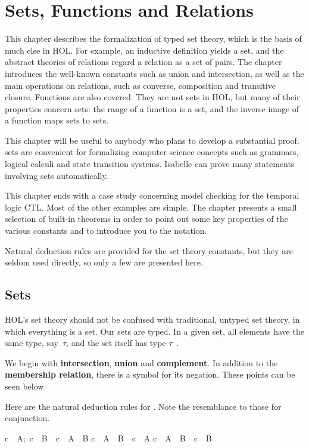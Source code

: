 \chapter{Sets, Functions and Relations}

This chapter describes the formalization of typed set theory, which is
the basis of much else in HOL\@.  For example, an
inductive definition yields a set, and the abstract theories of relations
regard a relation as a set of pairs.  The chapter introduces the well-known
constants such as union and intersection, as well as the main operations on relations, such as converse, composition and
transitive closure.  Functions are also covered.  They are not sets in
HOL, but many of their properties concern sets: the range of a
function is a set, and the inverse image of a function maps sets to sets.

This chapter will be useful to anybody who plans to develop a substantial
proof.  sets are convenient for formalizing  computer science concepts such
as grammars, logical calculi and state transition systems.  Isabelle can
prove many statements involving sets automatically.

This chapter ends with a case study concerning model checking for the
temporal logic CTL\@.  Most of the other examples are simple.  The
chapter presents a small selection of built-in theorems in order to point
out some key properties of the various constants and to introduce you to
the notation. 

Natural deduction rules are provided for the set theory constants, but they
are seldom used directly, so only a few are presented here.  


\section{Sets}

%
HOL's set theory should not be confused with traditional,  untyped set
theory, in which everything is a set.  Our sets are typed. In a given set,
all elements have the same type, say~$\tau$,  and the set itself has type
$\tau$~. 

We begin with \textbf{intersection}, \textbf{union} and
\textbf{complement}. In addition to the
\textbf{membership relation}, there  is a symbol for its negation. These
points can be seen below.  

Here are the natural deduction rules for .  Note
the  resemblance to those for conjunction.  
\begin{isabelle}
\isasymlbrakk c\ \isasymin\ A;\ c\ \isasymin\ B\isasymrbrakk\ 
\isasymLongrightarrow\ c\ \isasymin\ A\ \isasyminter\ B%
\isanewline
c\ \isasymin\ A\ \isasyminter\ B\ \isasymLongrightarrow\ c\ \isasymin\ A
\rulenamedx{IntD1}\isanewline
c\ \isasymin\ A\ \isasyminter\ B\ \isasymLongrightarrow\ c\ \isasymin\ B
\rulenamedx{IntD2}
\end{isabelle}


